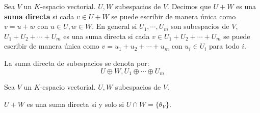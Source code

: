 \begin{definition}{}{}
    Sea $V$ un $K$-espacio vectorial. $U, W$ subespacios de $V$. Decimos que $U+W$ es una \textbf{suma directa} si cada $v \in U+W$ se puede escribir de manera única como $v = u+w$ con $u \in U, w \in W$.
    En general si $U_1, \cdots, U_m$ son subespacios de $V$, $U_1 + U_2 + \cdots + U_m$ es una suma directa si cada $v \in U_1 + U_2 + \cdots + U_m$ se puede escribir de manera única como $v = u_1 + u_2 + \cdots + u_m$ con $u_i \in U_i$ para todo $i$.
\end{definition}
\begin{notation}{}{}
    La suma directa de subespacios se denota por:
    $$U \oplus W, U_1 \oplus \cdots \oplus U_m $$
\end{notation}
\begin{proposition}{}{}
    Sea $V$ un $K$-espacio vectorial. $U, W$ subespacios de $V$.
    
    $U+W$ es una suma directa si y solo si $U \cap W = \{\theta_V\}$.
\end{proposition}
